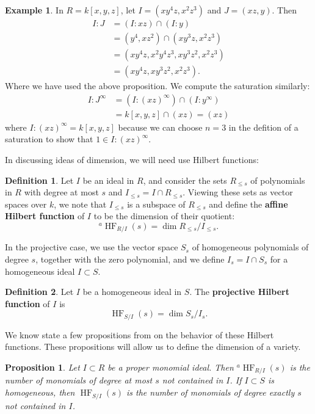 \documentclass[11pt]{article}
\DeclareMathOperator{\HF}{HF}
\newtheorem{proposition}{Proposition}
\theoremstyle{definition}
\newtheorem{definition}{Definition}
\newtheorem{example}{Example}
\begin{document}
\begin{example}
	In $R = k[x,y,z]$, let $I = (xy^4z, x^2z^3)$ and $J = (xz,y)$. Then \begin{align*}
		I : J &= (I : xz) \cap (I : y) \\
		&= (y^4, xz^2) \cap (xy^3z, x^2 z^3) \\
		&= (xy^4z, x^2y^4z^3, xy^3z^2, x^2z^3) \\
		&= (xy^4z, xy^3z^2, x^2z^3).
	\end{align*} Where we have used the above proposition. We compute the saturation similarly: \begin{align*}
		I : J^\infty &= (I : (xz)^\infty) \cap (I : y^\infty) \\
		&= k[x,y,z] \cap (xz) = (xz)
	\end{align*} where $I: (xz)^\infty = k[x,y,z]$ because we can choose $n = 3$ in the defition of a saturation to show that $1 \in I : (xz)^\infty$. 
\end{example}


In discussing ideas of dimension, we will need use Hilbert functions: 


\begin{definition}
	Let $I$ be an ideal in $R$, and consider the sets $R_{\leq s}$ of polynomials in $R$ with degree at most $s$ and $I_{\leq s} = I \cap R_{\leq s}$. Viewing these sets as vector spaces over $k$, we note that $I_{\leq s}$ is a subspace of $R_{\leq s}$ and define the \textbf{affine Hilbert function} of $I$ to be the dimension of their quotient: \[ ^a\HF_{R/I}(s) = \dim R_{\leq s} / I_{\leq s}. \] 
\end{definition}

In the projective case, we use the vector space $S_s$ of homogeneous polynomials of degree $s$, together with the zero polynomial, and we define $I_s = I \cap S_s$ for a homogeneous ideal $I \subset S$. 

\begin{definition}
	Let $I$ be a homogeneous ideal in $S$. The \textbf{projective Hilbert function} of $I$ is \[ \HF_{S/I}(s) = \dim S_s/I_s.  \]
\end{definition}


We know state a few propositions from \cite{cox2013ideals} on the behavior of these Hilbert functions. These propositions will allow us to define the dimension of a variety. 


\begin{proposition}
	Let $I \subset R$ be a proper monomial ideal. Then $^a\HF_{R/I}(s)$ is the number of monomials of degree at most $s$ not contained in $I$. If $I \subset S$ is homogeneous, then $\HF_{S/I}(s)$ is the number of monomials of degree exactly $s$ not contained in $I$. 
\end{proposition}
\end{document}
